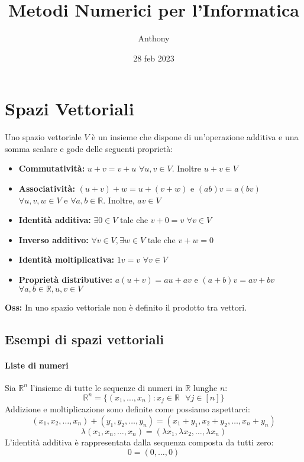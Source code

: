 \documentclass{article}
\title{Metodi Numerici per l'Informatica}
\author{Anthony}
\date{28 feb 2023}
\begin{document}
    \maketitle

    \section{Spazi Vettoriali}
        Uno spazio vettoriale $V$ è un insieme che dispone di un'operazione additiva e una somma scalare e gode delle 
        seguenti proprietà:
        \begin{itemize}
            \item \textbf{Commutatività:} $u+v = v+u$ $\forall u,v \in V$. Inoltre $u+v \in V$
            \item \textbf{Associatività:} $(u+v)+w = u + (v+w)$ e $(ab)v = a(bv)$ $\forall u,v,w \in V$ e $\forall a,b \in 
            \mathbb{R}$. Inoltre, $av \in V$\
            \item \textbf{Identità additiva:} $\exists 0 \in V$ tale che $v+0=v$ $\forall v \in V$
            \item \textbf{Inverso additivo:} $\forall v \in V, \exists w \in V$ tale che $v+w=0$
            \item \textbf{Identità moltiplicativa:} $1v = v$ $\forall v \in V$
            \item \textbf{Proprietà distributive:} $a(u+v)= au+av$ e $(a+b)v = av+bv$ $\forall a,b \in \mathbb{R}, u,v \in V$
        \end{itemize}
        \textbf{Oss:} In uno spazio vettoriale non è definito il prodotto tra vettori.
        \subsection{Esempi di spazi vettoriali}
            \paragraph{Liste di numeri}
                Sia $\mathbb{R}^n$ l'insieme di tutte le sequenze di numeri in $\mathbb{R}$ lunghe $n$:
                \[\mathbb{R}^n = \{ (x_1, \dots, x_n) : x_j \in \mathbb{R} \texttt{ } \forall j \in [n] \} \]
                Addizione e moltiplicazione sono definite come possiamo aspettarci:
                \[(x_1, x_2, \dots, x_n) + (y_1, y_2, \dots, y_n) = (x_1 + y_1, x_2 + y_2, \dots, x_n+y_n)\]
                \[\lambda(x_1,x_n, \dots, x_n) = (\lambda x_1, \lambda x_2, \dots, \lambda x_n)\]
                L'identità additiva è rappresentata dalla sequenza composta da tutti zero:
                \[ 0 = (0, \dots, 0)\]
\end{document}
